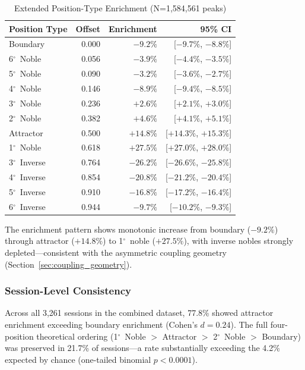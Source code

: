 \documentclass[11pt,a4paper]{article}
\newcommand{\degree}{$^\circ$}  %
\begin{document}
\begin{table}[H]
\centering
\caption{Extended Position-Type Enrichment (N=1,584,561 peaks)}
\label{tab:ged_extended}
\begin{tabular}{@{}lrrr@{}}
\toprule
Position Type & Offset & Enrichment & 95\% CI \\
\midrule
Boundary & 0.000 & $-9.2\%$ & [$-9.7\%$, $-8.8\%$] \\
6\degree\ Noble & 0.056 & $-3.9\%$ & [$-4.4\%$, $-3.5\%$] \\
5\degree\ Noble & 0.090 & $-3.2\%$ & [$-3.6\%$, $-2.7\%$] \\
4\degree\ Noble & 0.146 & $-8.9\%$ & [$-9.4\%$, $-8.5\%$] \\
3\degree\ Noble & 0.236 & $+2.6\%$ & [$+2.1\%$, $+3.0\%$] \\
2\degree\ Noble & 0.382 & $+4.6\%$ & [$+4.1\%$, $+5.1\%$] \\
Attractor & 0.500 & $+14.8\%$ & [$+14.3\%$, $+15.3\%$] \\
1\degree\ Noble & 0.618 & $+27.5\%$ & [$+27.0\%$, $+28.0\%$] \\
3\degree\ Inverse & 0.764 & $-26.2\%$ & [$-26.6\%$, $-25.8\%$] \\
4\degree\ Inverse & 0.854 & $-20.8\%$ & [$-21.2\%$, $-20.4\%$] \\
5\degree\ Inverse & 0.910 & $-16.8\%$ & [$-17.2\%$, $-16.4\%$] \\
6\degree\ Inverse & 0.944 & $-9.7\%$ & [$-10.2\%$, $-9.3\%$] \\
\bottomrule
\end{tabular}
\end{table}

The enrichment pattern shows monotonic increase from boundary ($-9.2\%$) through attractor ($+14.8\%$) to 1\degree\ noble ($+27.5\%$), with inverse nobles strongly depleted---consistent with the asymmetric coupling geometry (Section~\ref{sec:coupling_geometry}).

\subsubsection{Session-Level Consistency}

Across all 3,261 sessions in the combined dataset, 77.8\% showed attractor enrichment exceeding boundary enrichment (Cohen's $d = 0.24$). The full four-position theoretical ordering (1\degree\ Noble $>$ Attractor $>$ 2\degree\ Noble $>$ Boundary) was preserved in 21.7\% of sessions---a rate substantially exceeding the 4.2\% expected by chance (one-tailed binomial $p < 0.0001$).
\end{document}
